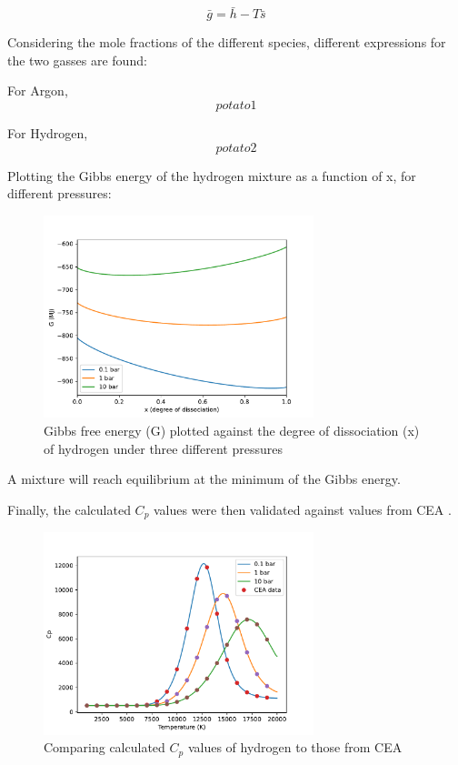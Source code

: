         \begin{equation}
            \bar g = \bar h - T \bar s
        \end{equation}

        Considering the mole fractions of the different species, different expressions for the two gasses are found:

        For Argon,
        \begin{equation}
            potato 1
        \end{equation}

        For Hydrogen,
        \begin{equation}
            potato 2
        \end{equation}


        Plotting the Gibbs energy of the hydrogen mixture as a function of x, for different pressures:

        \begin{figure}[!ht]
            \centering
            \includegraphics[width=0.7\textwidth]{assets/2 models/Gibbs.pdf}
            \caption{Gibbs free energy (G) plotted against the degree of dissociation (x) of hydrogen under three different pressures}
            \label{fig:Gibbs}
        \end{figure}

        A mixture will reach equilibrium at the minimum of the Gibbs energy.

        Finally, the calculated $C_p$ values were then validated against values from CEA \cite{CEARUNRev4}.
        
        \begin{figure}[!ht]
            \centering
            \includegraphics[width=0.7\textwidth]{assets/2 models/Cp_compare.pdf}
            \caption{Comparing calculated $C_p$ values of hydrogen to those from CEA}
            \label{fig:Cp_compare}
        \end{figure}

